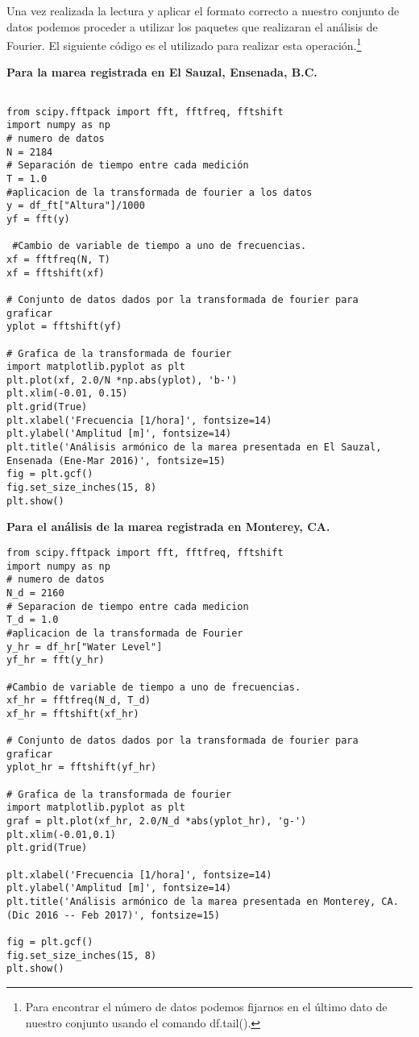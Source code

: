 Una vez realizada la lectura y aplicar el formato correcto a nuestro conjunto de datos podemos proceder a utilizar los paquetes que realizaran el análisis de Fourier. El siguiente código es el utilizado para realizar esta operación.\footnote{\footnotesize Para encontrar el número de datos podemos fijarnos en el último dato de nuestro conjunto usando el comando  \textsf{df.tail()}. }

\textbf{Para la marea registrada en El Sauzal, Ensenada, B.C.}
\begin{verbatim}

from scipy.fftpack import fft, fftfreq, fftshift
import numpy as np
# numero de datos
N = 2184
# Separación de tiempo entre cada medición
T = 1.0
#aplicacion de la transformada de fourier a los datos
y = df_ft["Altura"]/1000
yf = fft(y)

 #Cambio de variable de tiempo a uno de frecuencias.
xf = fftfreq(N, T)
xf = fftshift(xf)

# Conjunto de datos dados por la transformada de fourier para 
graficar
yplot = fftshift(yf)

# Grafica de la transformada de fourier
import matplotlib.pyplot as plt
plt.plot(xf, 2.0/N *np.abs(yplot), 'b-')
plt.xlim(-0.01, 0.15) 
plt.grid(True)
plt.xlabel('Frecuencia [1/hora]', fontsize=14)
plt.ylabel('Amplitud [m]', fontsize=14)
plt.title('Análisis armónico de la marea presentada en El Sauzal,
Ensenada (Ene-Mar 2016)', fontsize=15)
fig = plt.gcf()
fig.set_size_inches(15, 8)
plt.show()
\end{verbatim}

\textbf{Para el análisis de la marea registrada en Monterey, CA.}
\begin{verbatim}
from scipy.fftpack import fft, fftfreq, fftshift
import numpy as np
# numero de datos
N_d = 2160
# Separacion de tiempo entre cada medicion
T_d = 1.0
#aplicacion de la transformada de Fourier
y_hr = df_hr["Water Level"] 
yf_hr = fft(y_hr)

#Cambio de variable de tiempo a uno de frecuencias.
xf_hr = fftfreq(N_d, T_d)
xf_hr = fftshift(xf_hr)

# Conjunto de datos dados por la transformada de fourier para 
graficar
yplot_hr = fftshift(yf_hr)

# Grafica de la transformada de fourier
import matplotlib.pyplot as plt
graf = plt.plot(xf_hr, 2.0/N_d *abs(yplot_hr), 'g-')
plt.xlim(-0.01,0.1)
plt.grid(True)

plt.xlabel('Frecuencia [1/hora]', fontsize=14)
plt.ylabel('Amplitud [m]', fontsize=14)
plt.title('Análisis armónico de la marea presentada en Monterey, CA. (Dic 2016 -- Feb 2017)', fontsize=15)

fig = plt.gcf()
fig.set_size_inches(15, 8)
plt.show()
\end{verbatim}

